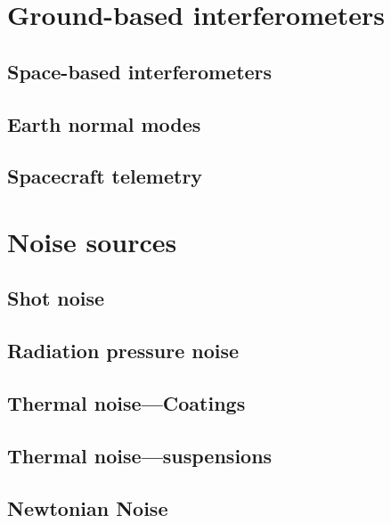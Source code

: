 \documentclass{kentigern}
\begin{document}
\section{Ground-based interferometers}
\label{sec:ground-based-interf}



\subsection{Space-based interferometers}
\label{sec:space-based-interf}

\subsection{Earth normal modes}
\label{sec:earth-normal-modes}

\subsection{Spacecraft telemetry}
\label{sec:spacecraft-telemetry}



\section{Noise sources}
\label{sec:an-overview-noise}

\subsection{Shot noise}
\label{sec:shot-noise}

\subsection{Radiation pressure noise}
\label{sec:radi-press-noise}

\subsection{Thermal noise---Coatings}
\label{sec:therm-noise-coat}

\subsection{Thermal noise---suspensions}
\label{sec:therm-noise-susp}


\subsection{Newtonian Noise}
\label{sec:newtonian-noise}
\end{document}
